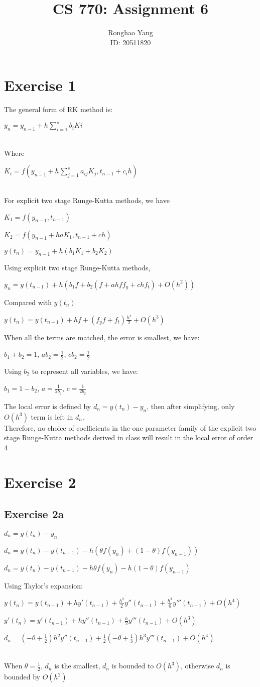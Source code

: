 \documentclass[11pt]{article} %
\title{CS 770: Assignment 6}
\author{Ronghao Yang\\ID: 20511820}
\begin{document}
\maketitle

\section{Exercise 1}
The general form of RK method is:\\
\centerline{$y_{n} = y_{n-1}+h\sum_{i=1}^{s}b_{i}K{i}$}\\
Where\\
\centerline{$K_{i} = f(y_{n-1}+h\sum_{j=1}^{s}a_{ij}K_{j},t_{n-1}+c_{i}h)$}\\
For explicit two stage Runge-Kutta methods, we have\\
\centerline{$K_{1} = f(y_{n-1},t_{n-1})$}
\centerline{$K_{2} = f(y_{n-1}+haK_{1},t_{n-1}+ch)$}
\centerline{$y(t_{n})=y_{n-1}+h(b_{1}K_{1}+b_{2}K_{2})$}
Using explicit two stage Runge-Kutta methods,\\
\centerline{$y_{n} = y(t_{n-1})+h(b_1f+b_2(f+ahff_y+chf_t)+O(h^2))$}
Compared with $y(t_{n})$\\
\centerline{$y(t_{n}) = y(t_{n-1})+hf+(f_yf+f_t)\frac{h^2}{2}+O(h^3)$}
When all the terms are matched, the error is smallest, we have:\\
\centerline{$b_1+b_2=1$, $ab_2=\frac{1}{2}$, $cb_2=\frac{1}{2}$}
Using $b_2$ to represent all variables, we have:\\
\centerline{$b_1=1-b_2$, $a = \frac{1}{2b_2}$, $c = \frac{1}{2b_2}$}
The local error is defined by $d_{n} = y(t_{n})-y_{n}$, then after simplifying, only $O(h^3)$ term is left in $d_{n}$.\\
Therefore, no choice of coefficients in the one parameter family of the explicit two stage Runge-Kutta methods derived in class will result in the local error of order 4
\section{Exercise 2}
\subsection{Exercise 2a}
\centerline{$d_{n} = y(t_{n})-y_{n}$}
\centerline{$d_{n} = y(t_{n})-y(t_{n-1})-h(\theta f(y_{n})+(1-\theta)f(y_{n-1}))$}
\centerline{$d_{n} = y(t_{n})-y(t_{n-1})-h\theta f(y_{n})-h(1-\theta)f(y_{n-1})$}
Using Taylor's expansion:\mbox{}\\
\centerline{$y(t_{n}) = y(t_{n-1})+hy'(t_{n-1})+\frac{h^{2}}{2}y''(t_{n-1})+\frac{h^{3}}{6}y'''(t_{n-1})+O(h^{4})$}
\centerline{$y'(t_{n}) = y'(t_{n-1}) + hy''(t_{n-1})+\frac{h}{2}y'''(t_{n-1})+O(h^3)$}
\centerline{$d_{n}=(-\theta+\frac{1}{2})h^{2}y''(t_{n-1})+\frac{1}{2}(-\theta+\frac{1}{3})h^{3}y'''(t_{n-1})+O(h^4)$}\\
When $\theta = \frac{1}{2}$, $d_{n}$ is the smallest, $d_{n}$ is bounded to $O(h^3)$, otherwise $d_{n}$ is bounded by $O(h^2)$
\end{document}
